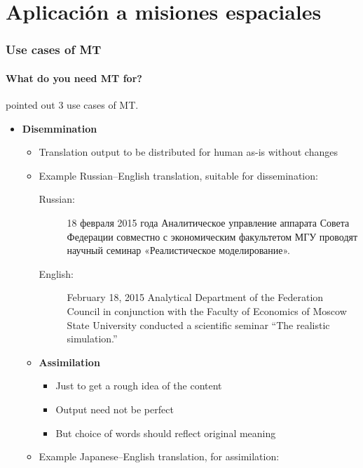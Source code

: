 \section{Aplicación a misiones espaciales}






\begin{frame}[allowframebreaks]
\frametitle{Use cases of MT}
\framesubtitle{What do you need MT for?}
\textcite[ch.~10]{Somers:2003} pointed out 3 use cases of MT.
\begin{itemize}
\item \textbf{Disemmination}
	\begin{itemize}
	\item Translation output to be distributed for human as-is without changes
	
	
	
\framebreak
	\item Example Russian--English translation, suitable for dissemination:
		\begin{description}
		\item[Russian:] 18 февраля 2015 года Аналитическое управление аппарата Совета Федерации совместно с экономическим факультетом МГУ проводят научный семинар «Реалистическое моделирование».
		\item[English:] February 18, 2015 Analytical Department of the Federation Council in conjunction with the Faculty of Economics of Moscow State University conducted a scientific seminar ``The realistic simulation.''
		\end{description}
\framebreak
\item \textbf{Assimilation} 
	\begin{itemize}
	\item Just to get a rough idea of the content
	\item Output need not be perfect
	\item But choice of words should reflect original meaning

	 \end{itemize}
\framebreak
	\item Example Japanese--English translation, for assimilation:
		\begin{description}
		

\end{description}
\end{itemize}
\end{itemize}
\end{frame}
